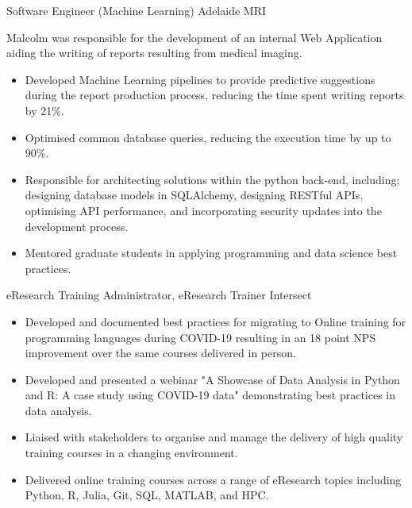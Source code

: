 {Software Engineer (Machine Learning)}
{Adelaide MRI}{}{}
{%
  Malcolm was responsible for the development of an internal Web Application
  aiding the writing of reports resulting from medical imaging.
  \begin{itemize}
    \item Developed Machine Learning pipelines to provide predictive
      suggestions during the report production process, reducing the time spent
      writing reports by 21\%.
    \item Optimised common database queries, reducing the execution time by
      up to 90\%.
    \item Responsible for architecting solutions
      within the python back-end, including;
      designing database models in SQLAlchemy,
      designing RESTful APIs,
      optimising API performance,
      and incorporating security updates into the development process.
    \item Mentored graduate students in applying programming and data science
      best practices.
  \end{itemize}
}

{eResearch Training Administrator, eResearch Trainer}
{Intersect}{}{}
{%
  \begin{itemize}
    \item Developed and documented best practices for migrating to Online
      training for programming languages during COVID-19 resulting in an
      18 point NPS improvement over the same courses delivered in person.
    \item Developed and presented a webinar
      {"A Showcase of Data Analysis in Python and R: A case study using COVID-19 data"}
      demonstrating best practices in data analysis.
    \item Liaised with stakeholders to organise and manage the delivery of high
      quality training courses in a changing environment.
    \item Delivered online training courses across a range of eResearch topics
      including Python, R, Julia, Git, SQL, MATLAB, and HPC.
  \end{itemize}
}

